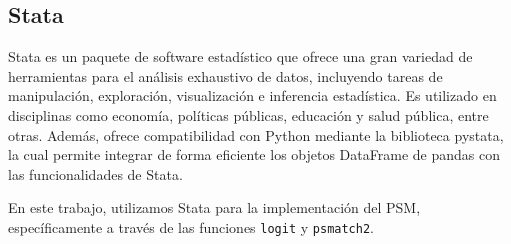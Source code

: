 \documentclass[../../main.tex]{subfiles}
\begin{document}
\subsection{Stata}
Stata \cite{stata-docs} es un paquete de software estadístico que ofrece una gran variedad
de herramientas para el análisis exhaustivo de datos, incluyendo tareas de manipulación,
exploración, visualización e inferencia estadística. Es utilizado en disciplinas como
economía, políticas públicas, educación y salud pública, entre otras. Además, ofrece
compatibilidad con Python mediante la biblioteca pystata, la cual permite integrar de
forma eficiente los objetos DataFrame de pandas con las funcionalidades de Stata.

En este trabajo, utilizamos Stata para la implementación del PSM, específicamente a través
de las funciones \texttt{logit} y \texttt{psmatch2}.
\end{document}

